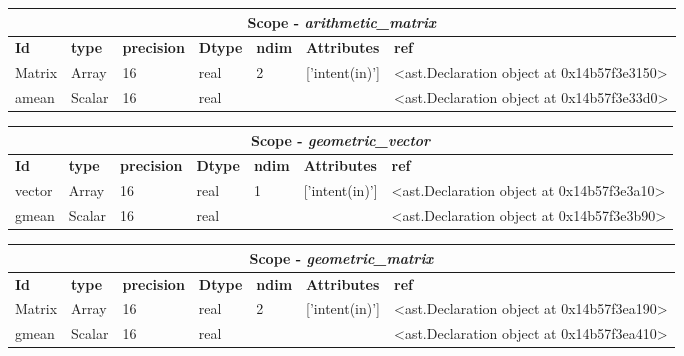 \documentclass{report}
\begin{document}
 \vspace{1cm}

\begin{center}
\begin{longtable}{|p{3.5cm}|p{1.5cm}|p{1.5cm}|p{1.5cm}|p{1cm}|p{2cm}|p{4cm}| }
\hline
\multicolumn{7}{|c|}{\textbf{Scope} -  \textbf{\textit{arithmetic\_matrix}}} \\ 
\hline
\textbf{Id} & \textbf{type} & \textbf{precision} & \textbf{Dtype} & \textbf{ndim} & \textbf{Attributes} & \textbf{ref} \\\hline

Matrix & Array & 16 & real & 2 & ['intent(in)'] & <ast.Declaration object at 0x14b57f3e3150> \\\hline

amean & Scalar & 16 & real &  &  & <ast.Declaration object at 0x14b57f3e33d0> \\\hline

\end{longtable}
\end{center}

 \vspace{1cm}

\begin{center}
\begin{longtable}{|p{3.5cm}|p{1.5cm}|p{1.5cm}|p{1.5cm}|p{1cm}|p{2cm}|p{4cm}| }
\hline
\multicolumn{7}{|c|}{\textbf{Scope} -  \textbf{\textit{geometric\_vector}}} \\ 
\hline
\textbf{Id} & \textbf{type} & \textbf{precision} & \textbf{Dtype} & \textbf{ndim} & \textbf{Attributes} & \textbf{ref} \\\hline

vector & Array & 16 & real & 1 & ['intent(in)'] & <ast.Declaration object at 0x14b57f3e3a10> \\\hline

gmean & Scalar & 16 & real &  &  & <ast.Declaration object at 0x14b57f3e3b90> \\\hline

\end{longtable}
\end{center}

 \vspace{1cm}

\begin{center}
\begin{longtable}{|p{3.5cm}|p{1.5cm}|p{1.5cm}|p{1.5cm}|p{1cm}|p{2cm}|p{4cm}| }
\hline
\multicolumn{7}{|c|}{\textbf{Scope} -  \textbf{\textit{geometric\_matrix}}} \\ 
\hline
\textbf{Id} & \textbf{type} & \textbf{precision} & \textbf{Dtype} & \textbf{ndim} & \textbf{Attributes} & \textbf{ref} \\\hline

Matrix & Array & 16 & real & 2 & ['intent(in)'] & <ast.Declaration object at 0x14b57f3ea190> \\\hline

gmean & Scalar & 16 & real &  &  & <ast.Declaration object at 0x14b57f3ea410> \\\hline

\end{longtable}
\end{center}
\end{document}
